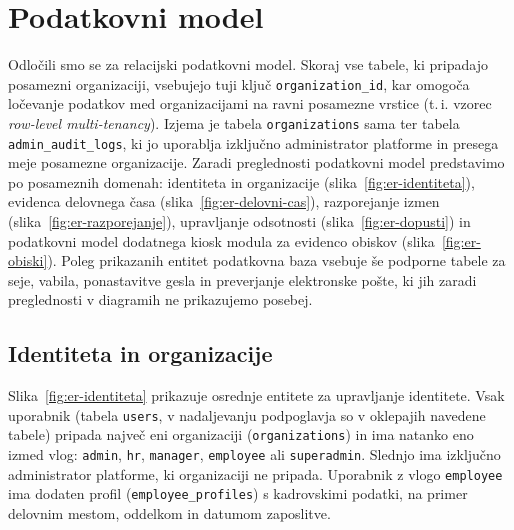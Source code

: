 \section{Podatkovni model}
\label{sec:podatkovni-model}

Odločili smo se za relacijski podatkovni model. Skoraj vse tabele, ki pripadajo posamezni organizaciji, vsebujejo tuji ključ \texttt{organization\_id}, kar omogoča ločevanje podatkov med organizacijami na ravni posamezne vrstice (t.\,i. vzorec \textit{row-level multi-tenancy}). Izjema je tabela \texttt{organizations} sama ter tabela \texttt{admin\_audit\_logs}, ki jo uporablja izključno administrator platforme in presega meje posamezne organizacije. Zaradi preglednosti podatkovni model predstavimo po posameznih domenah: identiteta in organizacije (slika~\ref{fig:er-identiteta}), evidenca delovnega časa (slika~\ref{fig:er-delovni-cas}), razporejanje izmen (slika~\ref{fig:er-razporejanje}), upravljanje odsotnosti (slika~\ref{fig:er-dopusti}) in podatkovni model dodatnega kiosk modula za evidenco obiskov (slika~\ref{fig:er-obiski}). Poleg prikazanih entitet podatkovna baza vsebuje še podporne tabele za seje, vabila, ponastavitve gesla in preverjanje elektronske pošte, ki jih zaradi preglednosti v diagramih ne prikazujemo posebej.

\subsection{Identiteta in organizacije}

Slika~\ref{fig:er-identiteta} prikazuje osrednje entitete za upravljanje identitete. Vsak uporabnik (tabela \texttt{users}, v nadaljevanju podpoglavja so v oklepajih navedene tabele) pripada največ eni organizaciji (\texttt{organizations}) in ima natanko eno izmed vlog: \texttt{admin}, \texttt{hr}, \texttt{manager}, \texttt{employee} ali \texttt{superadmin}. Slednjo ima izključno administrator platforme, ki organizaciji ne pripada. Uporabnik z vlogo \texttt{employee} ima dodaten profil (\texttt{employee\_profiles}) s kadrovskimi podatki, na primer delovnim mestom, oddelkom in datumom zaposlitve.

